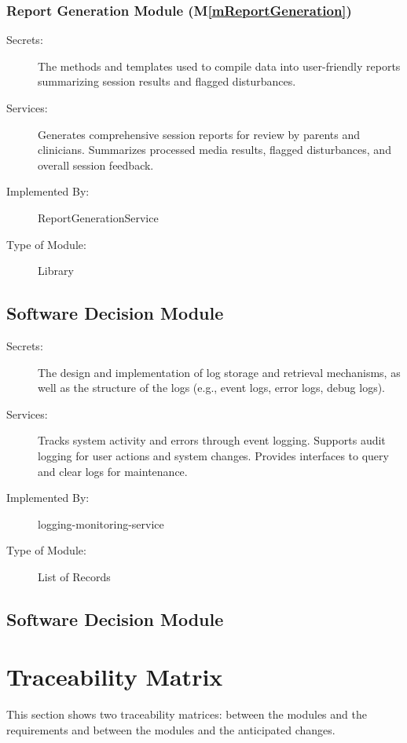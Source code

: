 \documentclass[12pt, titlepage]{article}
\newcommand{\mref}[1]{M\ref{#1}}
\begin{document}
\subsubsection{Report Generation Module (\mref{mReportGeneration})}

\begin{description}
\item[Secrets:] The methods and templates used to compile data into user-friendly reports summarizing session results and flagged disturbances.
\item[Services:] Generates comprehensive session reports for review by parents and clinicians. Summarizes processed media results, flagged disturbances, and overall session feedback.
\item[Implemented By:] ReportGenerationService
\item[Type of Module:] Library
\end{description}


\subsection{Software Decision Module}

\begin{description}
\item[Secrets:] The design and implementation of log storage and retrieval mechanisms, as well as the structure of the logs (e.g., event logs, error logs, debug logs).
\item[Services:] Tracks system activity and errors through event logging. Supports audit logging for user actions and system changes.
Provides interfaces to query and clear logs for maintenance.
\item[Implemented By:] logging-monitoring-service
\item[Type of Module:] List of Records
\end{description}

\subsection{Software Decision Module}

\section{Traceability Matrix} \label{SecTM}

This section shows two traceability matrices: between the modules and the
requirements and between the modules and the anticipated changes.
\end{document}
